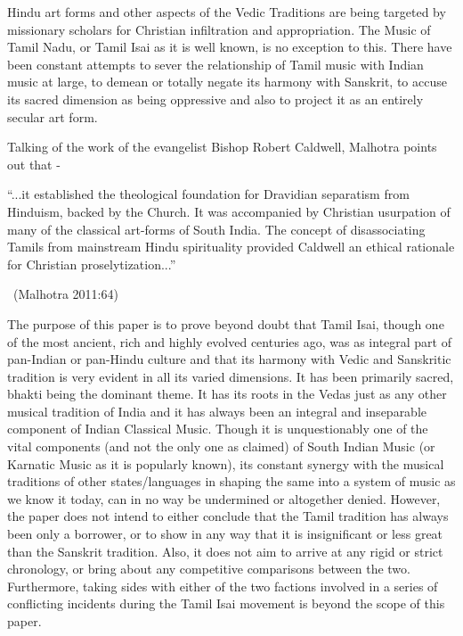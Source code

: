 Hindu art forms and other aspects of the Vedic Traditions are being targeted by missionary scholars for Christian infiltration and appropriation. The Music of Tamil Nadu, or Tamil Isai as it is well known, is no exception to this. There have been constant attempts to sever the relationship of Tamil music with Indian music at large, to demean or totally negate its harmony with Sanskrit, to accuse its sacred dimension as being oppressive and also to project it as an entirely secular art form.

Talking of the work of the evangelist Bishop Robert Caldwell, Malhotra points out that -

\begin{myquote}
“...it established the theological foundation for Dravidian separatism from Hinduism, backed by the Church. It was accompanied by Christian usurpation of many of the classical art-forms of South India. The concept of disassociating Tamils from mainstream Hindu spirituality provided Caldwell an ethical rationale for Christian proselytization...”

~\hfill (Malhotra 2011:64)
\end{myquote}

The purpose of this paper is to prove beyond doubt that Tamil Isai, though one of the most ancient, rich and highly evolved centuries ago, was as integral part of pan-Indian or pan-Hindu culture and that its harmony with Vedic and Sanskritic tradition is very evident in all its varied dimensions. It has been primarily sacred, bhakti being the dominant theme. It has its roots in the Vedas just as any other musical tradition of India and it has always been an integral and inseparable component of Indian Classical Music. Though it is unquestionably one of the vital components (and not the only one as claimed) of South Indian Music (or Karnatic Music as it is popularly known), its constant synergy with the musical traditions of other states/languages in shaping the same into a system of music as we know it today, can in no way be undermined or altogether denied. However, the paper does not intend to either conclude that the Tamil tradition has always been only a borrower, or to show in any way that it is insignificant or less great than the Sanskrit tradition. Also, it does not aim to arrive at any rigid or strict chronology, or bring about any competitive comparisons between the two. Furthermore, taking sides with either of the two factions involved in a series of conflicting incidents during the Tamil Isai movement is beyond the scope of this paper.

